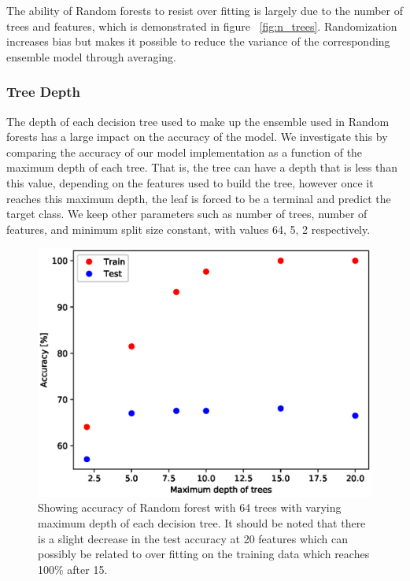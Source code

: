 \documentclass{article} %
\begin{document}
The ability of Random forests to resist over fitting is largely due to the number of trees and features, which is demonstrated in figure ~\ref{fig:n_trees}. Randomization increases bias but makes it possible to reduce the variance of the corresponding ensemble model through averaging. \cite{formann-roe_2012}

\subsubsection{Tree Depth}

The depth of each decision tree used to make up the ensemble used in Random forests has a large impact on the accuracy of the model. We investigate this by comparing the accuracy of our model implementation as a function of the maximum depth of each tree. That is, the tree can have a depth that is less than this value, depending on the features used to build the tree, however once it reaches this maximum depth, the leaf is forced to be a terminal and predict the target class. We keep other parameters such as number of trees, number of features, and minimum split size constant, with values 64, 5, 2 respectively. 

\begin{figure}[ht]
\begin{center}
\includegraphics[scale=0.4]{max_depth}
\end{center}
\caption{Showing accuracy of Random forest with 64 trees with varying maximum depth of each decision tree. It should be noted that there is a slight decrease in the test accuracy at 20 features which can possibly be related to over fitting on the training data which reaches 100\% after 15.}
\label{fig:max_depth}
\end{figure}
\end{document}
